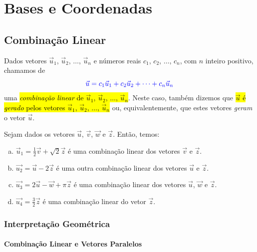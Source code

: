 

\chapter{Bases e Coordenadas}\label{cap_base}

\section{Combinação Linear}\label{cap_base_sec_comblin}

Dados vetores $\vec{u}_1$, $\vec{u}_2$, $\dotsc$, $\vec{u}_n$ e números reais $c_1$, $c_2$, $\dotsc$, $c_n$, com $n$ inteiro positivo, chamamos de
\begin{equation}
  {\color{blue}\vec{u} = c_1\vec{u}_1 + c_2\vec{u}_2 + \cdots + c_n\vec{u}_n}
\end{equation}
uma \hl{\emph{combinação linear} de $\vec{u}_1$, $\vec{u}_2$, $\dotsc$, $\vec{u}_n$}. Neste caso, também dizemos que \hl{$\vec{u}$ é \emph{gerado} pelos vetores $\vec{u}_1$, $\vec{u}_2$, $\dotsc$, $\vec{u}_n$} ou, equivalentemente, que estes vetores \emph{geram} o vetor $\vec{u}$.

\begin{ex}\label{cap_base_sec_comblin:ex:comblinear}
  Sejam dados os vetores $\vec{u}$, $\vec{v}$, $\vec{w}$ e $\vec{z}$. Então, temos:
  \begin{enumerate}[a)]
  \item $\vec{u}_1 = \frac{1}{2}\vec{v} + \sqrt{2}\vec{z}$ é uma combinação linear dos vetores $\vec{v}$ e $\vec{z}$.
  \item $\vec{u_2} = \vec{u} - 2\vec{z}$ é uma outra combinação linear dos vetores $\vec{u}$ e $\vec{z}$.
  \item $\vec{u_3} = 2\vec{u} - \vec{w} + \pi\vec{z}$ é uma combinação linear dos vetores $\vec{u}$, $\vec{w}$ e $\vec{z}$.
  \item $\vec{u_4} = \frac{3}{2}\vec{z}$ é uma combinação linear do vetor $\vec{z}$.
  \end{enumerate}
\end{ex}

\subsection{Interpretação Geométrica}

\subsubsection{Combinação Linear e Vetores Paralelos}

